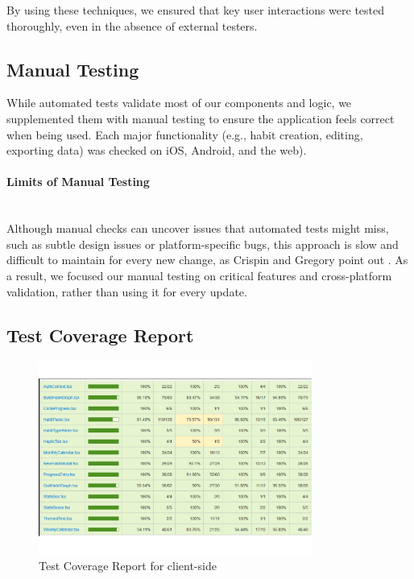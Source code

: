 By using these techniques, we ensured that key user interactions were tested thoroughly, even in the absence of external testers.


\subsection{Manual Testing}

While automated tests validate most of our components and logic, we supplemented them with manual testing to ensure the application feels correct when being used. Each major functionality (e.g., habit creation, editing, exporting data) was checked on iOS, Android, and the web).

\paragraph{Limits of Manual Testing}\mbox{}\\
Although manual checks can uncover issues that automated tests might miss, such as subtle design issues or platform-specific bugs, this approach is slow and difficult to maintain for every new change, as Crispin and Gregory point out \cite{crispin2009agiletesting}. As a result, we focused our manual testing on critical features and cross-platform validation, rather than using it for every update.

\subsection{Test Coverage Report} \label{sect:test-coverage} 
\begin{figure}[H]
    \centering
    \includegraphics[width=0.8\textwidth]{resources/test_one.pdf}
    \caption{Test Coverage Report for client-side}
    \label{fig:test_one}
\end{figure}

